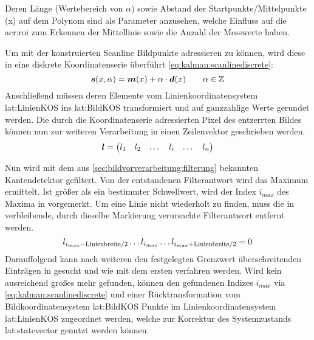 Deren Länge (Wertebereich von \(\alpha\)) sowie Abstand der Startpunkte/Mittelpunkte (x) auf dem Polynom sind als Parameter anzusehen, welche Einfluss auf die \gls{acr:roi} zum Erkennen der Mittellinie sowie die Anzahl der Messwerte haben.

Um mit der konstruierten Scanline Bildpunkte adressieren zu können, wird diese in eine diskrete Koordinatenserie überführt \ref{eq:kalman:scanlinediscrete}:
\begin{equation}
\label{eq:kalman:scanlinediscrete}
\boldsymbol{s}(x,\alpha) =
\boldsymbol{m}(x)
  + \alpha \cdot \boldsymbol{d}(x)
\qquad \alpha \in \mathbb{Z}
\end{equation}
Anschließend müssen deren Elemente vom Linienkoordinatensystem \gls{lat:LinienKOS} ins \gls{lat:BildKOS} transformiert und auf ganzzahlige Werte gerundet werden.
Die durch die Koordinatenserie adressierten Pixel des entzerrten Bildes können nun zur weiteren Verarbeitung in einen Zeilenvektor  geschrieben werden. 
 \begin{equation}
 \boldsymbol{l} =
 \begin{pmatrix}
 l_1 & l_2 & \dots & l_i & \dots & l_n
 \end{pmatrix}
 \end{equation}
 
Nun wird  mit dem aus \ref{sec:bildvorverarbeitung:filterung} bekannten Kantendetektor gefiltert. Von der entstandenen Filterantwort  wird das Maximum  ermittelt. Ist  größer als ein bestimmter Schwellwert, wird der Index \begin{math} i_{max} \end{math} des Maxima in  vorgemerkt. Um eine Linie nicht wiederholt zu finden, muss die in  verbleibende, durch dieselbe Markierung verursachte Filterantwort entfernt  werden.
\begin{equation}
l_{i_{max}-\text{Linienbreite}/2} \dots l_{i_{max}} 
 \dots  l_{i_{max}+\text{Linienbreite}/2} = 0
 \end{equation}
Darauffolgend kann nach weiteren den festgelegten Grenzwert überschreitenden Einträgen in  gesucht und wie mit dem ersten  verfahren werden.
Wird kein ausreichend großes  mehr gefunden, können den gefundenen Indizes \begin{math} i_{max} \end{math} via \eqref{eq:kalman:scanlinediscrete} und einer Rücktransformation vom Bildkoordinatensystem \gls{lat:BildKOS} Punkte  im Linienkoordinatensystem \gls{lat:LinienKOS} zugeordnet werden, welche zur Korrektur des Systemzustands \gls{lat:statevector} genutzt werden können.


